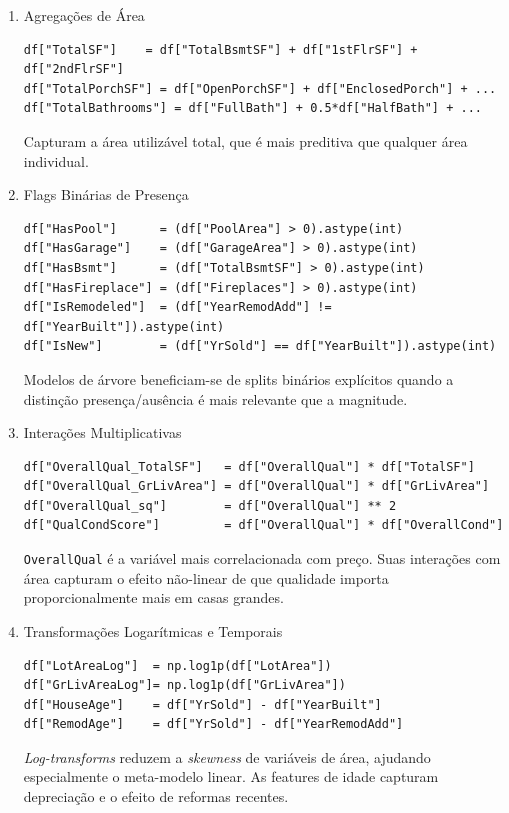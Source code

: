 \documentclass[11pt]{article}
\begin{document}
\begin{enumerate}
\item Agregações de Área
\label{sec:orgba0fdea}

\begin{verbatim}
df["TotalSF"]    = df["TotalBsmtSF"] + df["1stFlrSF"] + df["2ndFlrSF"]
df["TotalPorchSF"] = df["OpenPorchSF"] + df["EnclosedPorch"] + ...
df["TotalBathrooms"] = df["FullBath"] + 0.5*df["HalfBath"] + ...
\end{verbatim}

Capturam a área utilizável total, que é mais preditiva que qualquer área individual.
\item Flags Binárias de Presença
\label{sec:org577b4a4}

\begin{verbatim}
df["HasPool"]      = (df["PoolArea"] > 0).astype(int)
df["HasGarage"]    = (df["GarageArea"] > 0).astype(int)
df["HasBsmt"]      = (df["TotalBsmtSF"] > 0).astype(int)
df["HasFireplace"] = (df["Fireplaces"] > 0).astype(int)
df["IsRemodeled"]  = (df["YearRemodAdd"] != df["YearBuilt"]).astype(int)
df["IsNew"]        = (df["YrSold"] == df["YearBuilt"]).astype(int)
\end{verbatim}

Modelos de árvore beneficiam-se de splits binários explícitos quando a distinção presença/ausência é mais relevante que a magnitude.
\item Interações Multiplicativas
\label{sec:org0e2de67}

\begin{verbatim}
df["OverallQual_TotalSF"]   = df["OverallQual"] * df["TotalSF"]
df["OverallQual_GrLivArea"] = df["OverallQual"] * df["GrLivArea"]
df["OverallQual_sq"]        = df["OverallQual"] ** 2
df["QualCondScore"]         = df["OverallQual"] * df["OverallCond"]
\end{verbatim}

\texttt{OverallQual} é a variável mais correlacionada com preço. Suas
interações com área capturam o efeito não-linear de que qualidade
importa proporcionalmente mais em casas grandes.
\item Transformações Logarítmicas e Temporais
\label{sec:orge285d29}

\begin{verbatim}
df["LotAreaLog"]  = np.log1p(df["LotArea"])
df["GrLivAreaLog"]= np.log1p(df["GrLivArea"])
df["HouseAge"]    = df["YrSold"] - df["YearBuilt"]
df["RemodAge"]    = df["YrSold"] - df["YearRemodAdd"]
\end{verbatim}

\emph{Log-transforms} reduzem a \emph{skewness} de variáveis de área, ajudando especialmente o meta-modelo linear. As features de idade capturam depreciação e o efeito de reformas recentes.
\end{enumerate}
\end{document}
